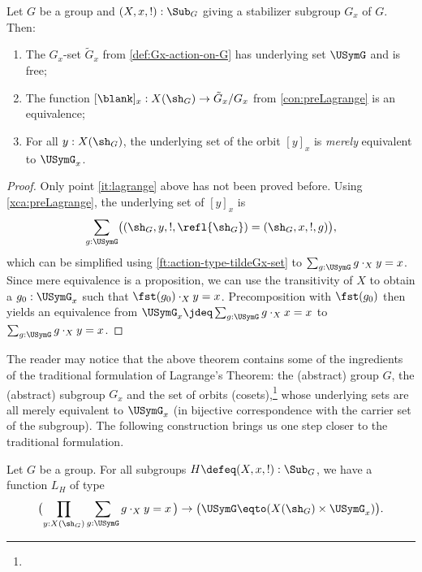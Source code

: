 \begin{theorem}\label{thm:summary5.4}
  Let $G$ be a group and $(X,x,!):\Sub_G$ giving a 
  stabilizer subgroup $G_x$ of $G$. Then:
  \begin{enumerate}
  \item The $G_x$-set $\tilde G_x$ from \cref{def:Gx-action-on-G}
  has underlying set $\USymG$ and is free; 
  \item
  The function $[\blank]_x : X(\sh_G)\to\tilde G_x /G_x$
  from \cref{con:preLagrange} is an equivalence;
  \item\label{it:lagrange}
  For all $y:X(\sh_G)$, the underlying set of the orbit $[y]_x$ 
  is \emph{merely} equivalent to $\USymG_x$.
  \end{enumerate}
\end{theorem}

\begin{proof}
Only point \ref{it:lagrange} above has not been proved before.
Using \cref{xca:preLagrange}, the underlying set of $[y]_x$ is 
\[
\sum_{g:\USymG}\bigl((\sh_G,y,!,\refl{\sh_G})=(\sh_G,x,!,g)\bigr),
\]
which can be simplified using \cref{ft:action-type-tildeGx-set} to
$\sum_{g:\USymG} g\cdot_X y = x$. 
Since mere equivalence is a proposition,
we can use the transitivity of $X$ to obtain a $g_0:\USymG_x$ such that
$\fst(g_0)\cdot_X y = x$. Precomposition with $\fst(g_0)$ then yields
an equivalence from $\USymG_x \jdeq \sum_{g:\USymG} g\cdot_X x = x$
to $\sum_{g:\USymG} g\cdot_X y = x$.
\end{proof}

The reader may notice that the above theorem contains some of
the ingredients of the traditional formulation of Lagrange's Theorem:
the (abstract) group $G$, the (abstract) subgroup $G_x$
and the set of orbits (cosets),\footnote{%
} 
whose underlying sets are all merely equivalent to $\USymG_x$
(in bijective correspondence with the carrier set of the subgroup).
The following construction brings us one step closer to the
traditional formulation.

\begin{construction}\label{con:lagrange}
Let $G$ be a group. For all subgroups $H\defeq(X,x,!):\Sub_G$,
we have a function $L_H$ of type
\[
\bigl(\prod_{y:X(\sh_G)}\sum_{g:\USymG} g\cdot_X y = x \,\bigr) \to
\bigl(\USymG \eqto (X(\sh_G) \times \USymG_x)\bigr).
\]
\end{construction}

